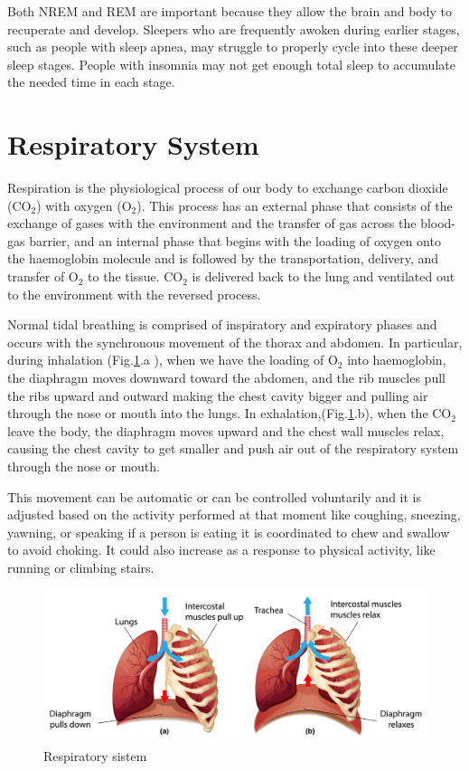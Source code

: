 Both NREM and REM are important because they allow the brain and body to recuperate and develop. Sleepers who are frequently awoken during earlier stages, such as people with sleep apnea, may struggle to properly cycle into these deeper sleep stages. People with insomnia may not get enough total sleep to accumulate the needed time in each stage.

\section{Respiratory System} \label{cap:respiratorySystem}


Respiration is the physiological process\cite{FISHER1983223} of our body to exchange carbon dioxide (CO$_2$) with oxygen (O$_2$). This process has an external phase that consists of the exchange of gases with the environment and the transfer of gas across the blood-gas barrier, and an internal phase that begins with the loading of oxygen onto the haemoglobin molecule and is followed by the transportation, delivery, and transfer of O$_2$ to the tissue. CO$_2$ is delivered back to the lung and ventilated out to the environment with the reversed process.

Normal tidal breathing is comprised of inspiratory and expiratory phases and occurs with the synchronous movement of the thorax and abdomen.
In particular, during inhalation (Fig.\ref{fig:resp}.a ), when we have the loading of O$_2$ into haemoglobin, the diaphragm moves downward toward the abdomen, and the rib muscles pull the ribs upward and outward making the chest cavity bigger and pulling air through the nose or mouth into the lungs. In exhalation,(Fig.\ref{fig:resp}.b), when the CO$_2$ leave the body, the diaphragm moves upward and the chest wall muscles relax, causing the chest cavity to get smaller and push air out of the respiratory system through the nose or mouth.

This movement can be automatic or can be controlled voluntarily and it is adjusted based on the activity performed at that moment like coughing, sneezing, yawning, or speaking if a person is eating it is coordinated to chew and swallow to avoid choking. It could also increase as a response to physical activity, like running or climbing stairs\cite{DelNegro2018BreathingMatters}.\\

\begin{figure}[H]
    \centering
    \includegraphics[width=\textwidth]{img/j338_ps1n_201111.png}
    \caption{Respiratory sistem}
    \label{fig:resp}
\end{figure}


